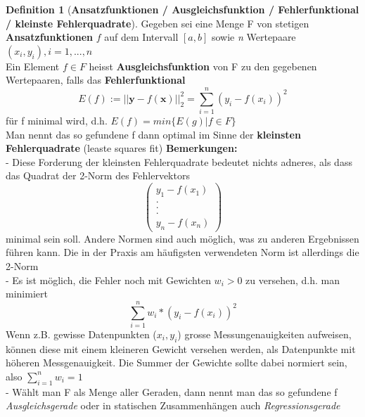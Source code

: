 \documentclass{article}
\theoremstyle{satz}
\theoremstyle{definition}
\newtheorem{definition}{Definition}
\begin{document}
\theoremstyle{definition}
\begin{tcolorbox}
\begin{definition}[\textbf{Ansatzfunktionen / Ausgleichsfunktion / Fehlerfunktional / kleinste Fehlerquadrate}]
Gegeben sei eine Menge F von stetigen \textbf{Ansatzfunktionen} $f$ auf dem Intervall $[a,b]$ sowie \textit{n} Wertepaare $(x_i, y_i), i = 1,..., n$\\
Ein Element $f \in F$ heisst \textbf{Ausgleichsfunktion} von F zu den gegebenen Wertepaaren, falls das \textbf{Fehlerfunktional}
\begin{equation}
E(f):= || \textbf{y} - f(\textbf{x}) ||^2_2 = \sum\limits_{i=1}^n (y_i - f(x_i))^2 
\end{equation}
für f minimal wird, d.h. $E(f) = min \{E(g) | f \in F\}$\\
Man nennt das so gefundene f dann optimal im Sinne der \textbf{kleinsten Fehlerquadrate} (leaste squares fit)
\textbf{Bemerkungen: }\\
- Diese Forderung der kleinsten Fehlerquadrate bedeutet nichts adneres, als dass das Quadrat der 2-Norm des Fehlervektors
\begin{equation}
\begin{pmatrix}
y_1 - f(x_1)\\
.\\
.\\
.\\
y_n - f(x_n)
\end{pmatrix}
\end{equation}
minimal sein soll. Andere Normen sind auch möglich, was zu anderen Ergebnissen führen kann. Die in der Praxis am häufigsten verwendeten Norm ist allerdings die 2-Norm\\
- Es ist möglich, die Fehler noch mit Gewichten $w_i > 0$ zu versehen, d.h. man minimiert
\begin{equation}
	\sum\limits_{i=1}^n w_i * (y_i - f(x_i))^2
\end{equation}
Wenn z.B. gewisse Datenpunkten ($x_i, y_i$) grosse Messungenauigkeiten aufweisen, können diese mit einem kleineren Gewicht versehen werden, als Datenpunkte mit höheren Messgenauigkeit. Die Summer der Gewichte sollte dabei normiert sein, also $\sum\limits_{i=1}^n w_i = 1$\\
- Wählt man F als Menge aller Geraden, dann nennt man das so gefundene f \textit{Ausgleichsgerade} oder in statischen Zusammenhängen auch \textit{Regressionsgerade}
\end{definition}
\end{tcolorbox}
\end{document}
